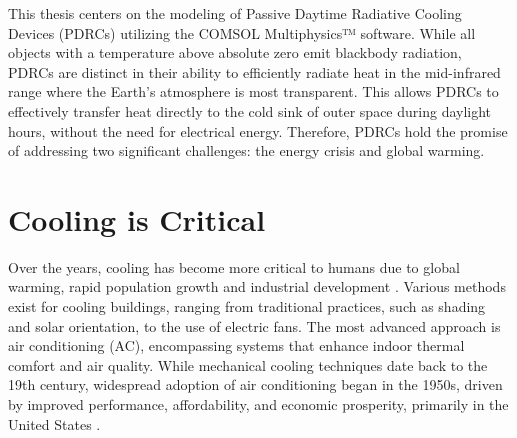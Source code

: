 


This thesis centers on the modeling of Passive Daytime Radiative Cooling Devices (PDRCs) utilizing the COMSOL Multiphysics™ software. While all objects with a temperature above absolute zero emit blackbody radiation, PDRCs are distinct in their ability to efficiently radiate heat in the mid-infrared range where the Earth's atmosphere is most transparent. This allows PDRCs to effectively transfer heat directly to the cold sink of outer space during daylight hours, without the need for electrical energy. Therefore, PDRCs hold the promise of addressing two significant challenges: the energy crisis and global warming. %

\section{Cooling is Critical}
Over the years, cooling has become more critical to humans due to global warming, rapid population growth and industrial development \cite{chen_passive_2022}. Various methods exist for cooling buildings, ranging from traditional practices, such as shading and solar orientation, to the use of electric fans. The most advanced approach is air conditioning (AC), encompassing systems that enhance indoor thermal comfort and air quality. While mechanical cooling techniques date back to the 19th century, widespread adoption of air conditioning began in the 1950s, driven by improved performance, affordability, and economic prosperity, primarily in the United States \cite{international_energy_agency_future_2018}.

